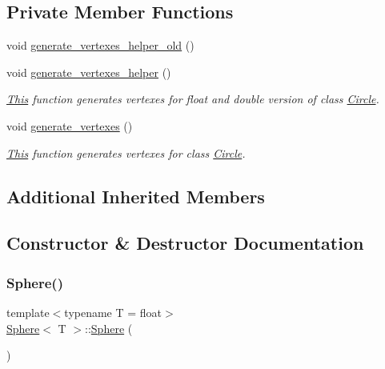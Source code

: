 \subsection*{Private Member Functions}
\begin{DoxyCompactItemize}
\item 
void \mbox{\hyperlink{classSphere_ab739ad1931e58a4ba7c84e3ca5c1965d}{generate\+\_\+vertexes\+\_\+helper\+\_\+old}} ()
\item 
void \mbox{\hyperlink{classSphere_a84a45f41ca9e630beb97fc106b359ffd}{generate\+\_\+vertexes\+\_\+helper}} ()
\begin{DoxyCompactList}\small\item\em \mbox{\hyperlink{classThis}{This}} function generates vertexes for float and double version of class \mbox{\hyperlink{classCircle}{Circle}}. \end{DoxyCompactList}\item 
void \mbox{\hyperlink{classSphere_a9cfac85b9803fadc4b79db0ea047f679}{generate\+\_\+vertexes}} ()
\begin{DoxyCompactList}\small\item\em \mbox{\hyperlink{classThis}{This}} function generates vertexes for class \mbox{\hyperlink{classCircle}{Circle}}. \end{DoxyCompactList}\end{DoxyCompactItemize}
\subsection*{Additional Inherited Members}


\subsection{Constructor \& Destructor Documentation}
\mbox{\label{classSphere_acacfd6de079ea50acdaf57b823166651}} 
\subsubsection{\texorpdfstring{Sphere()}{Sphere()}\hspace{0.1cm}{\footnotesize\ttfamily [1/3]}}
{\footnotesize\ttfamily template$<$typename T  = float$>$ \\
\mbox{\hyperlink{classSphere}{Sphere}}$<$ T $>$\+::\mbox{\hyperlink{classSphere}{Sphere}} (\begin{DoxyParamCaption}{ }\end{DoxyParamCaption})\hspace{0.3cm}{\ttfamily [inline]}}



